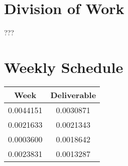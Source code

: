 \documentclass[letterpaper,12pt]{article}
\begin{document}
\section{Division of Work}

???

\section{Weekly Schedule}


\begin{table}[ht]
\begin{center}

\label{tbl:bins} %
\begin{tabular}{|cc|} 
\hline
\multicolumn{1}{|c}{\textbf{Week}} & \multicolumn{1}{c|}{\textbf{Deliverable}} \\
\hline
0.0044151 &   0.0030871 \\
0.0021633 &   0.0021343 \\
0.0003600 &   0.0018642 \\
0.0023831 &   0.0013287 \\
\hline
\end{tabular}
\end{center}
\end{table}
\end{document}
